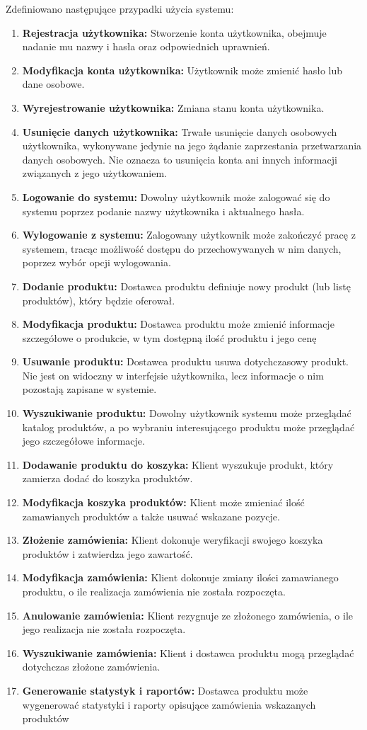 \documentclass[11pt,a4paper,twoside]{article}
\begin{document}
\vspace*{1\baselineskip}
Zdefiniowano następujące przypadki użycia systemu:
\begin{enumerate}[start=1,label={PU\arabic*.}]
\item \textbf{Rejestracja użytkownika:} Stworzenie konta użytkownika, obejmuje nadanie mu nazwy i hasła oraz odpowiednich uprawnień.
\item \textbf{Modyfikacja konta użytkownika:} Użytkownik może zmienić hasło lub dane osobowe.
\item \textbf{Wyrejestrowanie użytkownika:} Zmiana stanu konta użytkownika.
\item \textbf{Usunięcie danych użytkownika:} Trwałe usunięcie danych osobowych użytkownika, wykonywane jedynie na jego żądanie zaprzestania przetwarzania danych osobowych. Nie oznacza to usunięcia konta ani innych informacji związanych z jego użytkowaniem.
\item \textbf{Logowanie do systemu:} Dowolny użytkownik może zalogować się do systemu poprzez podanie nazwy użytkownika i aktualnego hasła.
\item \textbf{Wylogowanie z systemu:} Zalogowany użytkownik może zakończyć pracę z systemem, tracąc możliwość dostępu do przechowywanych w nim danych, poprzez wybór opcji wylogowania.
\item \textbf{Dodanie produktu:} Dostawca produktu definiuje nowy produkt (lub listę produktów), który będzie oferował. 
\item \textbf{Modyfikacja produktu:} Dostawca produktu może zmienić informacje szczegółowe o produkcie, w tym dostępną ilość produktu i jego cenę
\item \textbf{Usuwanie produktu:} Dostawca produktu usuwa dotychczasowy produkt. Nie jest on widoczny w interfejsie użytkownika, lecz informacje o nim pozostają zapisane w systemie.
\item \textbf{Wyszukiwanie produktu:} Dowolny użytkownik systemu może przeglądać katalog produktów, a po wybraniu interesującego produktu może przeglądać jego szczegółowe informacje.
\item \textbf{Dodawanie produktu do koszyka:} Klient wyszukuje produkt, który zamierza dodać do koszyka produktów. 
\item \textbf{Modyfikacja koszyka produktów:} Klient może zmieniać ilość zamawianych produktów a także usuwać wskazane pozycje.
\item \textbf{Złożenie zamówienia:} Klient dokonuje weryfikacji swojego koszyka produktów i zatwierdza jego zawartość.
\item \textbf{Modyfikacja zamówienia:} Klient dokonuje zmiany ilości zamawianego produktu, o ile realizacja zamówienia nie została rozpoczęta.
\item \textbf{Anulowanie zamówienia:} Klient rezygnuje ze złożonego zamówienia, o ile jego realizacja nie została rozpoczęta.
\item \textbf{Wyszukiwanie zamówienia:} Klient i dostawca produktu mogą przeglądać dotychczas złożone zamówienia.
\item \textbf{Generowanie statystyk i raportów:} Dostawca produktu może wygenerować statystyki i raporty opisujące zamówienia wskazanych produktów
\end{enumerate}
\end{document}
